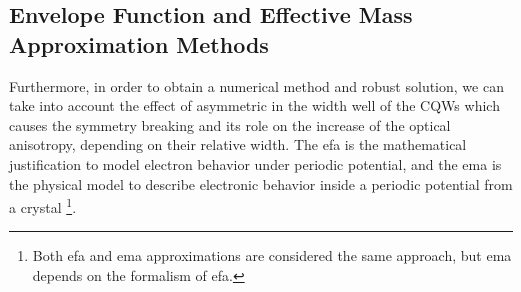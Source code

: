 \subsection{Envelope Function and Effective Mass Approximation Methods}
\label{subsec:chapter-2-efa-and-ema}
\vspace{-10mm} 
Furthermore, in order to obtain a numerical method and robust solution, we can take into account
the effect of asymmetric in the width well of the \gls{CQWs} which causes the symmetry breaking
and its role on the increase of the optical anisotropy, depending on their relative width. The \gls{efa} is the mathematical justification to model electron behavior under periodic potential, and the \gls{ema} is the physical
model to describe electronic behavior inside a periodic potential from a crystal \cite{harrison2016quantum}\footnote{Both \gls{efa} and \gls{ema} approximations are considered the same approach, but \gls{ema} depends on the formalism of \gls{efa}.}.
